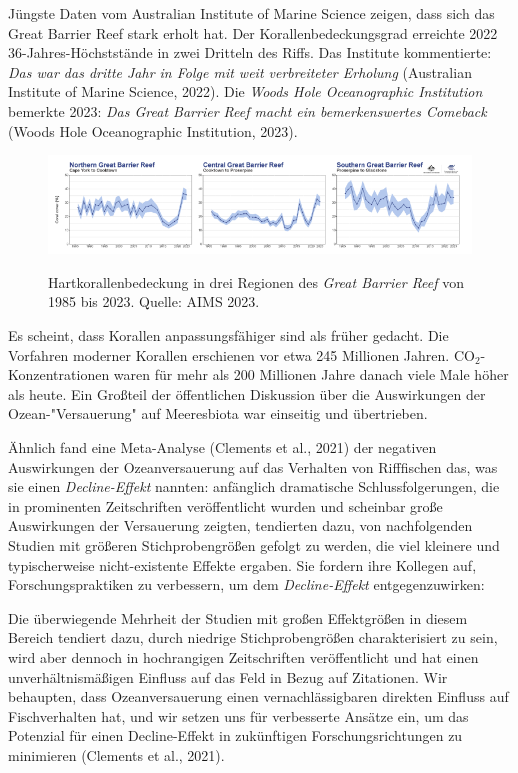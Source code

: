 \documentclass[12pt,paper=a4,DIV=12,parskip=never,chapterprefix=false,headings=standardclasses]{scrreprt}
\numberwithin{figure}{chapter}
\begin{document}
Jüngste Daten vom Australian Institute of Marine Science zeigen, dass sich das Great Barrier Reef stark erholt hat. Der Korallenbedeckungsgrad erreichte 2022 36-Jahres-Höchststände in zwei Dritteln des Riffs. Das Institute kommentierte: \emph{Das war das dritte Jahr in Folge mit weit verbreiteter Erholung} (Australian Institute of Marine Science, 2022). Die \emph{Woods Hole Oceanographic Institution} bemerkte 2023: \emph{Das Great Barrier Reef macht ein bemerkenswertes Comeback} (Woods Hole Oceanographic Institution, 2023).

\begin{figure}[H]
\begin{center}
\includegraphics[width=1.0\textwidth]{bilder/bilderKlima-0005.png}\\[1cm]
\end{center}
\caption{Hartkorallenbedeckung in drei Regionen des \emph{Great Barrier Reef} von 1985 bis 2023. Quelle: AIMS 2023.}
\end{figure}

Es scheint, dass Korallen anpassungsfähiger sind als früher gedacht. Die Vorfahren moderner Korallen erschienen vor etwa 245 Millionen Jahren. CO$_2$-Konzentrationen waren für mehr als 200 Millionen Jahre danach viele Male höher als heute. Ein Großteil der öffentlichen Diskussion über die Auswirkungen der Ozean-"Versauerung" auf Meeresbiota war einseitig und übertrieben.

Ähnlich fand eine Meta-Analyse (Clements et al., 2021) der negativen Auswirkungen der Ozeanversauerung auf das Verhalten von Rifffischen das, was sie einen \emph{Decline-Effekt} nannten: anfänglich dramatische Schlussfolgerungen, die in prominenten Zeitschriften veröffentlicht wurden und scheinbar große Auswirkungen der Versauerung zeigten, tendierten dazu, von nachfolgenden Studien mit größeren Stichprobengrößen gefolgt zu werden, die viel kleinere und typischerweise nicht-existente Effekte ergaben. Sie fordern ihre Kollegen auf, Forschungspraktiken zu verbessern, um dem \emph{Decline-Effekt} entgegenzuwirken:

Die überwiegende Mehrheit der Studien mit großen Effektgrößen in diesem Bereich tendiert dazu, durch niedrige Stichprobengrößen charakterisiert zu sein, wird aber dennoch in hochrangigen Zeitschriften veröffentlicht und hat einen unverhältnismäßigen Einfluss auf das Feld in Bezug auf Zitationen. Wir behaupten, dass Ozeanversauerung einen vernachlässigbaren direkten Einfluss auf Fischverhalten hat, und wir setzen uns für verbesserte Ansätze ein, um das Potenzial für einen Decline-Effekt in zukünftigen Forschungsrichtungen zu minimieren (Clements et al., 2021).
\end{document}
